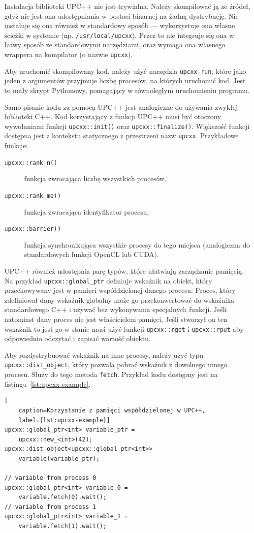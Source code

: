 \documentclass[twocolumn]{article}
\begin{document}
Instalacja biblioteki UPC++ nie jest trywialna.
Należy skompilować ją ze źródeł, gdyż nie jest ona udostępniania w postaci
binarnej na żadną dystrybucję.
Nie instaluje się ona również w standardowy sposób --- wykorzystuje ona własne
ścieżki w systemie (np. \texttt{/usr/local/upcxx}).
Przez to nie integruje się ona w łatwy sposób ze standardowymi narzędziami,
oraz wymaga ona własnego wrappera na kompilator (o nazwie \texttt{upcxx}).

Aby uruchomić skompilowany kod, należy użyć narzędzia \texttt{upcxx-run},
które jako jeden z argumentów przyjmuje liczbę procesów, na których uruchomić kod.
Jest to mały skrypt Pythonowy, pomagający w równoległym uruchomieniu programu.

Samo pisanie kodu za pomocą UPC++ jest analogiczne do używania
zwykłej biblioteki C++.
Kod korzystający z funkcji UPC++ musi być otoczony wywołaniami funkcji
\texttt{upcxx::init()} oraz \texttt{upcxx::finalize()}.
Większość funkcji dostępna jest z kontekstu statycznego z
przestrzeni nazw \texttt{upcxx}.
Przykładowe funkcje:
\begin{description}
\item[\texttt{upcxx::rank\_n()}] funkcja zwracająca liczbę wszystkich procesów,
\item[\texttt{upcxx::rank\_me()}] funkcja zwracająca identyfikator procesu,
\item[\texttt{upcxx::barrier()}] funkcja synchronizująca wszystkie procesy do tego miejsca
(analogiczna do standardowych funkcji OpenCL lub CUDA).
\end{description}

UPC++ również udostępnia parę typów, które ułatwiają zarządzanie pamięcią.
Na przykład \texttt{upcxx::global\_ptr} definiuje wskaźnik na obiekt, który
przechowywany jest w pamięci współdzielonej danego procesu.
Proces, który zdefiniował dany wskaźnik globalny może go
przekonwertować do wskaźnika standardowego C++ i używać
bez wykonywania specjalnych funkcji.
Jeśli natomiast dany proces nie jest właścicielem pamięci,
Jeśli stworzył on ten wskaźnik to jest go w stanie
musi użyć funkcji \texttt{upcxx::rget} i \texttt{upcxx::rput} aby
odpowiednio odczytać i zapisać wartość obiektu.

Aby rozdystrybuować wskaźnik na inne procesy, należy
użyć typu \texttt{upcxx::dist\_object}, który pozwala pobrać
wskaźnik z dowolnego innego procesu.
Służy do tego metoda \texttt{fetch}.
Przykład kodu dostępny jest na listingu~\ref{lst:upcxx-example}.

\begin{lstlisting}[
    caption=Korzystanie z pamięci współdzielonej w UPC++,
    label={lst:upcxx-example}]
upcxx::global_ptr<int> variable_ptr =
    upcxx::new_<int>(42);
upcxx::dist_object<upcxx::global_ptr<int>>
    variable(variable_ptr);

// variable from process 0
upcxx::global_ptr<int> variable_0 =
    variable.fetch(0).wait();
// variable from process 1
upcxx::global_ptr<int> variable_1 =
    variable.fetch(1).wait();
\end{lstlisting}
\end{document}
